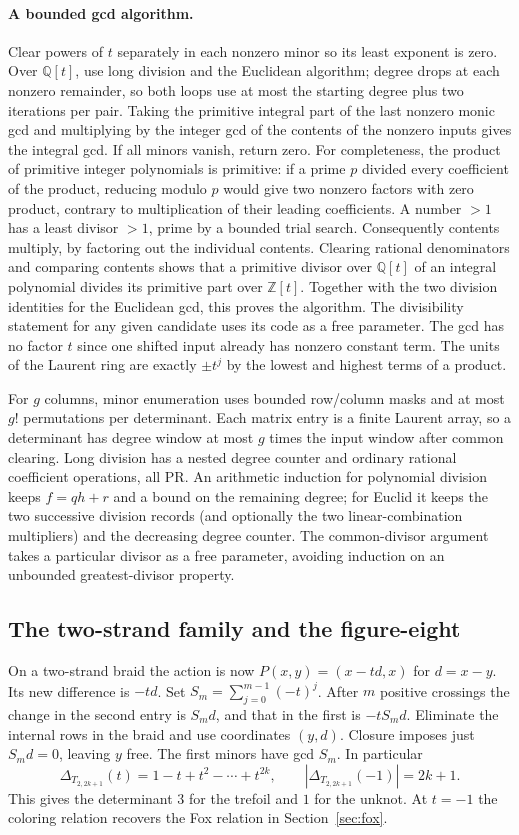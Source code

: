 \paragraph{A bounded gcd algorithm.}
Clear powers of $t$ separately in each nonzero minor so its least exponent is zero. Over $\mathbb Q[t]$, use long division and the Euclidean algorithm; degree drops at each nonzero remainder, so both loops use at most the starting degree plus two iterations per pair. Taking the primitive integral part of the last nonzero monic gcd and multiplying by the integer gcd of the contents of the nonzero inputs gives the integral gcd. If all minors vanish, return zero. For completeness, the product of primitive integer polynomials is primitive: if a prime $p$ divided every coefficient of the product, reducing modulo $p$ would give two nonzero factors with zero product, contrary to multiplication of their leading coefficients. A number $>1$ has a least divisor $>1$, prime by a bounded trial search. Consequently contents multiply, by factoring out the individual contents. Clearing rational denominators and comparing contents shows that a primitive divisor over $\mathbb Q[t]$ of an integral polynomial divides its primitive part over $\mathbb Z[t]$. Together with the two division identities for the Euclidean gcd, this proves the algorithm. The divisibility statement for any given candidate uses its code as a free parameter. The gcd has no factor $t$ since one shifted input already has nonzero constant term. The units of the Laurent ring are exactly $\pm t^j$ by the lowest and highest terms of a product.

For $g$ columns, minor enumeration uses bounded row/column masks and at most $g!$ permutations per determinant. Each matrix entry is a finite Laurent array, so a determinant has degree window at most $g$ times the input window after common clearing. Long division has a nested degree counter and ordinary rational coefficient operations, all PR. An arithmetic induction for polynomial division keeps $f=q h+r$ and a bound on the remaining degree; for Euclid it keeps the two successive division records (and optionally the two linear-combination multipliers) and the decreasing degree counter. The common-divisor argument takes a particular divisor as a free parameter, avoiding induction on an unbounded greatest-divisor property.

\subsection{The two-strand family and the figure-eight}
On a two-strand braid the action is now $P(x,y)=(x-t d,x)$ for $d=x-y$. Its new difference is $-td$. Set $S_m=\sum_{j=0}^{m-1}(-t)^j$. After $m$ positive crossings the change in the second entry is $S_m d$, and that in the first is $-t S_m d$. Eliminate the internal rows in the braid and use coordinates $(y,d)$. Closure imposes just $S_m d=0$, leaving $y$ free. The first minors have gcd $S_m$. In particular
\[
 \Delta_{T_{2,2k+1}}(t)=1-t+t^2-\cdots+t^{2k},\qquad
 |\Delta_{T_{2,2k+1}}(-1)|=2k+1 .
\]
This gives the determinant $3$ for the trefoil and $1$ for the unknot. At $t=-1$ the coloring relation recovers the Fox relation in Section~\ref{sec:fox}.

